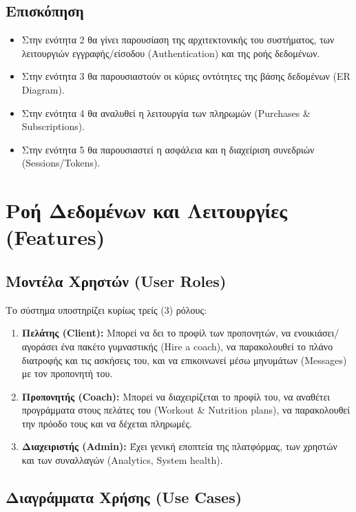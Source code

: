 \documentclass[12pt,a4paper]{report}
\begin{document}
\subsection{Επισκόπηση}
\begin{itemize}
    \item Στην ενότητα 2 θα γίνει παρουσίαση της αρχιτεκτονικής του συστήματος, των λειτουργιών εγγραφής/είσοδου (Authentication) και της ροής δεδομένων.
    \item Στην ενότητα 3 θα παρουσιαστούν οι κύριες οντότητες της βάσης δεδομένων (ER Diagram).
    \item Στην ενότητα 4 θα αναλυθεί η λειτουργία των πληρωμών (\textenglish{Purchases \& Subscriptions}).
    \item Στην ενότητα 5 θα παρουσιαστεί η ασφάλεια και η διαχείριση συνεδριών (Sessions/Tokens).
\end{itemize}

\newpage

\section{Ροή Δεδομένων και Λειτουργίες (Features)}

\subsection{Μοντέλα Χρηστών (User Roles)}
Το σύστημα υποστηρίζει κυρίως τρείς (3) ρόλους:
\begin{enumerate}
    \item \textbf{Πελάτης (Client):} Μπορεί να δει το προφίλ των προπονητών, να ενοικιάσει/αγοράσει ένα πακέτο γυμναστικής (Hire a coach), να παρακολουθεί το πλάνο διατροφής και τις ασκήσεις του, και να επικοινωνεί μέσω μηνυμάτων (Messages) με τον προπονητή του.
    \item \textbf{Προπονητής (Coach):} Μπορεί να διαχειρίζεται το προφίλ του, να αναθέτει προγράμματα στους πελάτες του (Workout \& Nutrition plans), να παρακολουθεί την πρόοδο τους και να δέχεται πληρωμές.
    \item \textbf{Διαχειριστής (Admin):} Έχει γενική εποπτεία της πλατφόρμας, των χρηστών και των συναλλαγών (Analytics, System health).
\end{enumerate}

\subsection{Διαγράμματα Χρήσης (Use Cases)}
\end{document}
